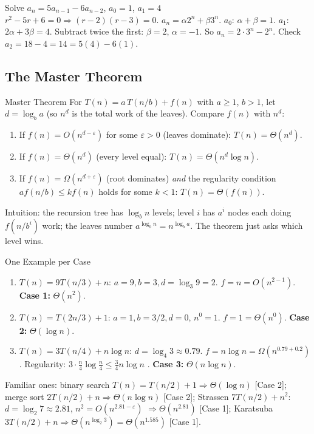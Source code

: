 \documentclass[11pt,a4paper]{article}
\begin{document}
\begin{worked}{Solve $a_n = 5a_{n-1} - 6a_{n-2}$, $a_0 = 1$, $a_1 = 4$}
$r^2 - 5r + 6 = 0 \Rightarrow (r-2)(r-3) = 0$. $a_n = \alpha 2^n + \beta 3^n$. $a_0$: $\alpha + \beta = 1$. $a_1$: $2\alpha + 3\beta = 4$. Subtract twice the first: $\beta = 2$, $\alpha = -1$. So $a_n = 2\cdot 3^n - 2^n$. Check $a_2 = 18 - 4 = 14 = 5(4) - 6(1)$. \checkmark
\end{worked}

\subsection{The Master Theorem}

\begin{formulabox}{Master Theorem}
For $T(n) = a\,T(n/b) + f(n)$ with $a \ge 1$, $b > 1$, let $d = \log_b a$ (so $n^d$ is the total work of the leaves). Compare $f(n)$ with $n^{d}$:
\begin{enumerate}
    \item[\textbf{Case 1}] If $f(n) = O(n^{d - \varepsilon})$ for some $\varepsilon > 0$ (leaves dominate): $T(n) = \Theta(n^{d})$.
    \item[\textbf{Case 2}] If $f(n) = \Theta(n^{d})$ (every level equal): $T(n) = \Theta(n^{d}\log n)$.
    \item[\textbf{Case 3}] If $f(n) = \Omega(n^{d + \varepsilon})$ (root dominates) \emph{and} the regularity condition $a f(n/b) \le k f(n)$ holds for some $k < 1$: $T(n) = \Theta(f(n))$.
\end{enumerate}
Intuition: the recursion tree has $\log_b n$ levels; level $i$ has $a^i$ nodes each doing $f(n/b^i)$ work; the leaves number $a^{\log_b n} = n^{\log_b a}$. The theorem just asks which level wins.
\end{formulabox}

\begin{worked}{One Example per Case}
\begin{enumerate}
    \item $T(n) = 9T(n/3) + n$: $a = 9, b = 3, d = \log_3 9 = 2$. $f = n = O(n^{2 - 1})$. \textbf{Case 1:} $\Theta(n^2)$.
    \item $T(n) = T(2n/3) + 1$: $a = 1, b = 3/2, d = 0$, $n^0 = 1$. $f = 1 = \Theta(n^0)$. \textbf{Case 2:} $\Theta(\log n)$.
    \item $T(n) = 3T(n/4) + n\log n$: $d = \log_4 3 \approx 0.79$. $f = n\log n = \Omega(n^{0.79 + 0.2})$. Regularity: $3\cdot\frac n4\log\frac n4 \le \frac34 n\log n$ \checkmark. \textbf{Case 3:} $\Theta(n\log n)$.
\end{enumerate}
Familiar ones: binary search $T(n) = T(n/2) + 1 \Rightarrow \Theta(\log n)$ [Case 2]; merge sort $2T(n/2) + n \Rightarrow \Theta(n\log n)$ [Case 2]; Strassen $7T(n/2) + n^2$: $d = \log_2 7 \approx 2.81$, $n^2 = O(n^{2.81 - \varepsilon})$ $\Rightarrow \Theta(n^{2.81})$ [Case 1]; Karatsuba $3T(n/2) + n \Rightarrow \Theta(n^{\log_2 3}) = \Theta(n^{1.585})$ [Case 1].
\end{worked}
\end{document}
